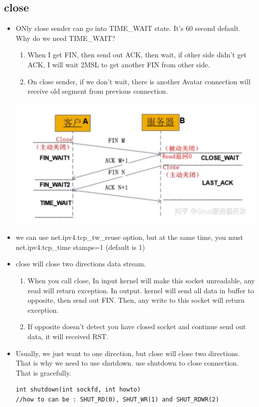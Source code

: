\documentclass[a4paper,11pt,twoside]{book}
\begin{document}
\subsection{close}
\begin{itemize}
	\item ONly close sender can go into TIME\_WAIT state. It's 60 second default. Why do we need TIME\_WAIT? 
	\begin{enumerate}
		\item When I get FIN, then send out ACK, then wait, if other side didn't get ACK, I will wait 2MSL to get another FIN from other side.
		\item On close sender, if we don't wait, there is another Avatar connection will receive old segment from previous connection.
	\end{enumerate}

	\begin{center}
		\includegraphics[width=0.66\linewidth]{pics/tcp2.png}
	\end{center}

	\item we can use net.ipv4.tcp\_tw\_reuse option, but at the same time, you must net.ipv4.tcp\_time
	stamps=1 (default is 1)
	
	\item close will close two directions data stream.
	\begin{enumerate}
		\item When you call close, In input kernel will make this socket unreadable,  any read will return exception. In output.  kernel will send all data in buffer to opposite, then send out FIN. Then, any write to this socket will return exception.
		\item If opposite doesn't detect you have closed socket and continue send out data, it will received RST. 
	\end{enumerate}

	\item Usually, we just want to one direction, but close will close two directions. That is why we need to use shutdown. use shutdown to close connection. That is gracefully.
\begin{lstlisting}
int shutdown(int sockfd, int howto)
//how to can be : SHUT_RD(0), SHUT_WR(1) and SHUT_RDWR(2)


\end{lstlisting}
\end{itemize}
\end{document}
